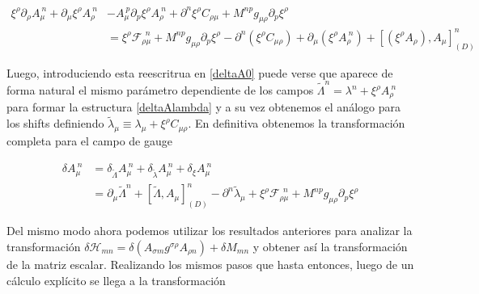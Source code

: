 \documentclass{article}
\numberwithin{equation}{section}
\begin{document}
\begin{equation}
\begin{aligned}
\xi^{\rho} \partial_{\rho} A_{\mu}^{\ n} +  \partial_{\mu} \xi^{\rho} A_{\rho}^{\ n} &- A_{\mu}^{\ p} \partial_p \xi^{\rho} A_{\rho}^{\ n} +  \partial^n \xi^{\rho} C_{\rho \mu} + M^{n p} g_{\mu \rho} \partial_p \xi^{\rho}\\
&= \xi^{\rho} \mathcal{F}_{\rho \mu}^{\ \ n} + M^{n p} g_{\mu \rho} \partial_p \xi^{\rho}  - \partial^n \left(\xi^{\rho} C_{\mu \rho}\right) +  \partial_{\mu} \left(\xi^{\rho} A_{\rho}^{\ n} \right) + \left[ \left(\xi^{\rho} A_{\rho} \right), A_{\mu}\right]_{(D)}^n
\end{aligned}
\end{equation}

Luego, introduciendo esta reescritrua en \ref{deltaA0} puede verse que aparece de forma natural el mismo parámetro dependiente de los campos $ \widetilde{\Lambda}^n = \lambda^n +  \xi^{\rho} A_{\rho}^{\ n} $ para formar la estructura \ref{deltaAlambda} y a su vez obtenemos el análogo para los shifts definiendo $ \widetilde{\lambda}_{\mu} \equiv \lambda_{\mu} + \xi^{\rho} C_{\mu \rho} $. En definitiva obtenemos la transformación completa para el campo de gauge

\begin{boxeq}
	\begin{equation}
	\begin{aligned}
	\delta A_{\mu}^{\ n} &= \delta_{\widetilde{\Lambda}} A_{\mu}^{\ n} + \delta_{\widetilde{\lambda}} A_{\mu}^{\ n} + \delta_{\xi} A_{\mu}^{\ n}\\
	&=\partial_{\mu} \widetilde{\Lambda}^n + \left[ \widetilde{\Lambda}, A_{\mu}\right]_{(D)}^n - \partial^n \widetilde{\lambda}_{\mu} + \xi^{\rho} \mathcal{F}_{\rho \mu}^{\ \ n} + M^{n p} g_{\mu \rho} \partial_p \xi^{\rho} 
	\end{aligned}
	\end{equation}
\end{boxeq}

\vspace{.5cm}

Del mismo modo ahora podemos utilizar los resultados anteriores para analizar la transformación $ \delta \mathcal{H}_{m n}= \delta \left( A_{\sigma m }g^{\sigma \rho} A_{\rho n} \right) + \delta M_{m n}$ y obtener así la transformación de la matriz escalar. Realizando los mismos pasos que hasta entonces, luego de un cálculo explícito se llega a la transformación
\end{document}
